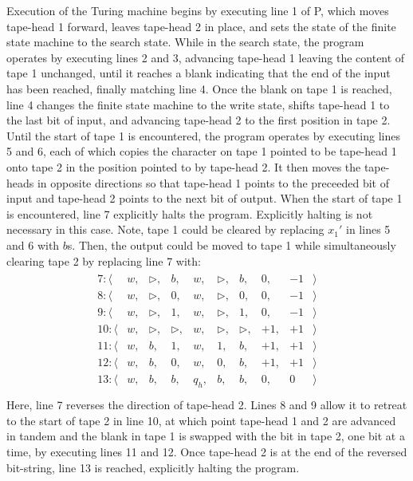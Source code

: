 Execution of the Turing machine begins by executing line 1 of P, which moves tape-head 1 forward, leaves tape-head 2 in place, and sets the state of the finite state machine to the search state. While in the search state, the program operates by executing lines 2 and 3, advancing tape-head 1 leaving the content of tape 1 unchanged, until it reaches a blank indicating that the end of the input has been reached, finally matching line 4.  Once the blank on tape 1 is reached, line 4 changes the finite state machine to the write state, shifts tape-head 1 to the last bit of input, and advancing tape-head 2 to the first position in tape 2.  Until the start of tape 1 is encountered, the program operates by executing lines 5 and 6, each of which copies the character on tape 1 pointed to be tape-head 1 onto tape 2 in the position pointed to by tape-head 2.  It then moves the tape-heads in opposite directions so that tape-head 1 points to the preceeded bit of input and tape-head 2 points to the next bit of output.  When the start of tape 1 is encountered, line 7 explicitly halts the program.   Explicitly halting is not necessary in this case.  Note, tape 1 could be cleared by replacing $x_1'$ in lines 5 and 6 with $b$s.  Then, the output could be moved to tape 1 while simultaneously clearing tape 2 by replacing line 7 with:
\begin{align*}
\begin{array}{rccccccrrrr}     7: \langle&w,& \triangleright,& b,& w,& \triangleright,& b,& 0,& -1&\rangle \\
        8: \langle&w,& \triangleright,& 0,& w,& \triangleright,& 0,& 0,& -1&\rangle \\
        9: \langle&w,& \triangleright,& 1,& w,& \triangleright,& 1,& 0,& -1&\rangle \\
        10: \langle&w,& \triangleright,& \triangleright,& w,& \triangleright,& \triangleright,& +1,& +1&\rangle \\
        11: \langle&w,&  b,& 1,& w,& 1,& b,& +1,& +1&\rangle \\
        12: \langle&w,&  b,& 0,& w,& 0,& b,& +1,& +1&\rangle \\
        13: \langle&w,&  b,& b,& q_h,& b,& b,& 0,& 0&\rangle \\
\end{array}
\end{align*}
Here, line 7 reverses the direction of tape-head 2. Lines 8 and 9 allow it to retreat to the start of tape 2 in line 10, at which point tape-head 1 and 2 are advanced in tandem and the blank in tape 1 is swapped with the bit in tape 2, one bit at a time, by executing lines 11 and 12.  Once tape-head 2 is at the end of the reversed bit-string, line 13 is reached, explicitly halting the program.
        